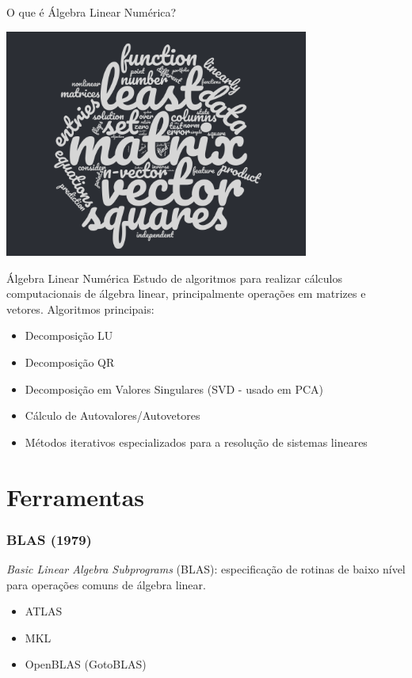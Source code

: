 \documentclass{beamer}
\begin{document}
\begin{darkframes}
  \begin{frame}{O que é Álgebra Linear Numérica?}
    \begin{center}
      \includegraphics[width=10cm]{figures/wordcloud.png}
    \end{center}
  \end{frame}
  
  \begin{frame}{Álgebra Linear Numérica}
    Estudo de algoritmos para realizar cálculos computacionais de álgebra linear, principalmente operações em matrizes e vetores.
    \vfill
    Algoritmos principais:
    \begin{itemize}
    \item Decomposição LU
    \item Decomposição QR
    \item Decomposição em Valores Singulares (SVD - usado em PCA)
    \item Cálculo de Autovalores/Autovetores
    \item Métodos iterativos especializados para a resolução de sistemas lineares
    \end{itemize}
  \end{frame}
  
  \section{Ferramentas}
  
  \begin{frame}
    \frametitle{BLAS (1979)}
    \emph{Basic Linear Algebra Subprograms} (BLAS): especificação de rotinas de baixo nível para operações comuns de álgebra linear. %
    \begin{itemize}
    \item ATLAS
    \item MKL
    \item OpenBLAS (GotoBLAS)
    \end{itemize}
    

\end{frame}
\end{darkframes}
\end{document}
